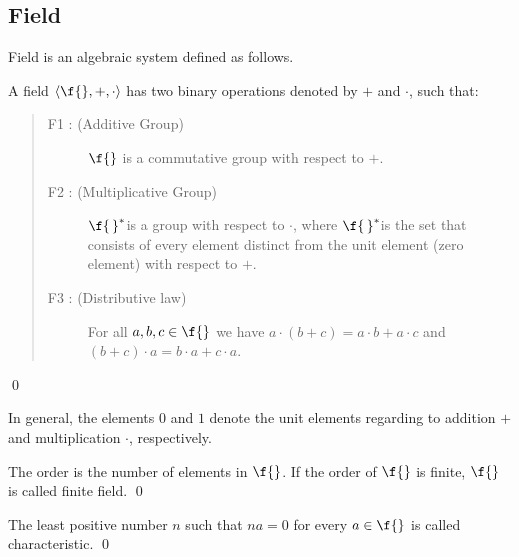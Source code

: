 \subsection{Field}
Field is an algebraic system defined as follows.
\begin{definition}[Field]
	A field $\langle\f{},+,\cdot\rangle$ has two binary operations denoted by $+$ and $\cdot$, such that:
	\begin{quote}\begin{description}
			\item[F1 : (Additive Group)] $\f{}$ is a commutative group with respect to $+$.
			\item[F2 : (Multiplicative Group)] ${\f{\,}}^{\ast}\!\!$ is a group with respect to $\cdot$, where ${\f{\,}}^{\ast}\!\!$ is the set that consists of every element distinct from the unit element (zero element) with respect to $+$.
			\item[F3 : (Distributive law)] For all $a,b,c \in\f{}$ we have $a\cdot(b+c)=a\cdot b+a\cdot c$ and $(b+c)\cdot a=b\cdot a +c\cdot a$.
	\end{description}\end{quote}
	\qed
\end{definition}
In general, the elements $0$ and $1$ denote the unit elements regarding to addition $+$ and multiplication $\cdot$, respectively.
\begin{definition}\hspace{0em}
	The order is the number of elements in $\f{}$. If the order of $\f{}$ is finite, $\f{}$ is called finite field. \qed
\end{definition}
\begin{definition}\hspace{0em}
	The least positive number $n$ such that $na=0$ for every $a\in \f{}$ is called characteristic. \qed
\end{definition}

